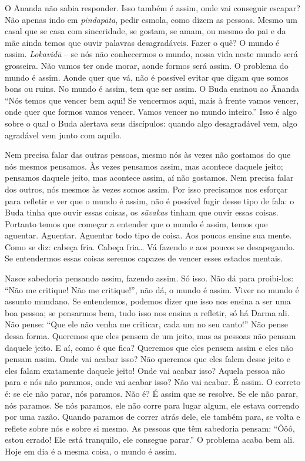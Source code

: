 O Ānanda não sabia responder. Isso também é assim, onde vai
conseguir escapar? Não apenas indo em \textit{pindapāta}, pedir
esmola, como dizem as pessoas. Mesmo um casal que se casa com
sinceridade, se gostam, se amam, ou mesmo do pai e da mãe ainda temos
que ouvir palavras desagradáveis. Fazer o quê? O mundo é assim.
\textit{Lokavidū} – se nós não conhecermos o mundo, nossa vida neste
mundo será grosseira. Não vamos ter onde morar, aonde formos será
assim. O problema do mundo é assim. Aonde quer que vá, não é possível
evitar que digam que somos bons ou ruins. No mundo é assim, tem que ser
assim. O Buda ensinou ao Ānanda “Nós temos que vencer bem aqui! Se
vencermos aqui, mais à frente vamos vencer, onde quer que formos vamos
vencer. Vamos vencer no mundo inteiro.” Isso é algo sobre o qual o Buda
alertava seus discípulos: quando algo desagradável vem, algo agradável
vem junto com aquilo.

Nem precisa falar das outras pessoas, mesmo nós às vezes não
gostamos do que nós mesmos pensamos. Às vezes pensamos assim, mas
acontece daquele jeito; pensamos daquele jeito, mas acontece assim, aí
não gostamos. Nem precisa falar dos outros, nós mesmos às vezes somos
assim. Por isso precisamos nos esforçar para refletir e ver que o mundo
é assim, não é possível fugir desse tipo de fala: o Buda tinha que
ouvir essas coisas, os \textit{sāvakas} tinham que ouvir essas
coisas. Portanto temos que começar a entender que o mundo é assim,
temos que aguentar. Aguentar. Aguentar todo tipo de coisa. Aos poucos
ensine sua mente. Como se diz: cabeça fria. Cabeça fria… Vá fazendo e
aos poucos se desapegando. Se entendermos essas coisas seremos capazes
de vencer esses estados mentais.

Nasce sabedoria pensando assim, fazendo assim. Só isso. Não dá para
proibi-los: “Não me critique! Não me critique!”, não dá, o mundo é
assim. Viver no mundo é assunto mundano. Se entendemos, podemos dizer
que isso nos ensina a ser uma boa pessoa; se pensarmos bem, tudo isso
nos ensina a refletir, só há Darma ali. Não pense: “Que ele não venha
me criticar, cada um no seu canto!” Não pense dessa forma. Queremos que
eles pensem de um jeito, mas as pessoas não pensam daquele jeito. E aí,
como é que fica? Queremos que eles pensem assim e eles não pensam
assim. Onde vai acabar isso? Não queremos que eles falem desse jeito e
eles falam exatamente daquele jeito! Onde vai acabar isso? Aquela
pessoa não para e nós não paramos, onde vai acabar isso? Não vai
acabar. É assim. O correto é: se ele não parar, nós paramos. Não é? É
assim que se resolve. Se ele não parar, nós paramos. Se nós paramos,
ele não corre para lugar algum, ele estava correndo por uma razão.
Quando paramos de correr atrás dele, ele também para, se volta e
reflete sobre nós e sobre si mesmo. As pessoas que têm sabedoria
pensam: “Ôôô, estou errado! Ele está tranquilo, ele consegue parar.” O
problema acaba bem ali. Hoje em dia é a mesma coisa, o mundo é assim.

